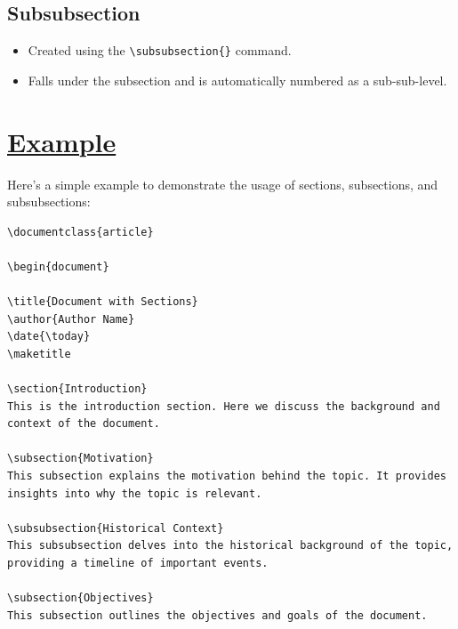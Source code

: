 \documentclass{article}
\begin{document}
\subsection{Subsubsection}
\begin{itemize}
    \item Created using the \texttt{\textbackslash subsubsection\{\}} command.
    \item Falls under the subsection and is automatically numbered as a sub-sub-level.
\end{itemize}
\newpage
\small{\section{\underline{Example}}

Here’s a simple example to demonstrate the usage of sections, subsections, and subsubsections:

\begin{verbatim}
\documentclass{article}

\begin{document}

\title{Document with Sections}
\author{Author Name}
\date{\today}
\maketitle

\section{Introduction}
This is the introduction section. Here we discuss the background and context of the document.

\subsection{Motivation}
This subsection explains the motivation behind the topic. It provides insights into why the topic is relevant.

\subsubsection{Historical Context}
This subsubsection delves into the historical background of the topic, providing a timeline of important events.

\subsection{Objectives}
This subsection outlines the objectives and goals of the document.


\end{verbatim}}
\end{document}
